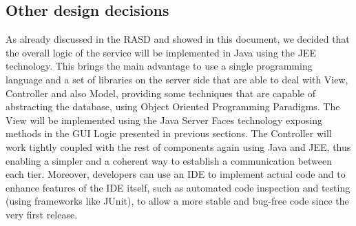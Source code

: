 \subsection{Other design decisions}
As already discussed in the RASD and showed in this document, we decided that the overall logic of the service will be implemented in Java using the JEE technology. This brings the main advantage to use a single programming language and a set of libraries on the server side that are able to deal with View, Controller and also Model, providing some techniques that are capable of abstracting the database, using Object Oriented Programming Paradigms. \newline
The View will be implemented using the Java Server Faces technology exposing methods in the GUI Logic presented in previous sections. The Controller will work tightly coupled with the rest of components again using Java and JEE, thus enabling a simpler and a coherent way to establish a communication between each tier. \newline Moreover, developers can use an IDE to implement actual code and to enhance features of the IDE itself, such as automated code inspection and testing (using frameworks like JUnit), to allow a more stable and bug-free code since the very first release. 
 